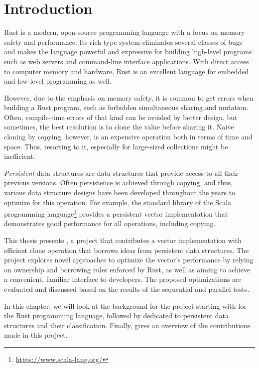 \chapter{Introduction}

Rust is a modern, open-source programming language with a focus on memory safety and performance. Its rich type system eliminates several classes of bugs and makes the language powerful and expressive for building high-level programs such as web servers and command-line interface applications. With direct access to computer memory and hardware, Rust is an excellent language for embedded and low-level programming as well.

However, due to the emphasis on memory safety, it is common to get errors when building a Rust program, such as forbidden simultaneous sharing and mutation. Often, compile-time errors of that kind can be avoided by better design, but sometimes, the best resolution is to clone the value before sharing it. Naive cloning by copying, however, is an expensive operation both in terms of time and space. Thus, resorting to it, especially for large-sized collections might be inefficient.

\emph{Persistent} data structures are data structures that provide access to all their previous versions. Often persistence is achieved through copying, and thus, various data structure designs have been developed throughout the years to optimize for this operation. For example, the standard library of the Scala programming language\footnote{\url{https://www.scala-lang.org/}} provides a persistent vector implementation that demonstrates good performance for all operations, including copying.

This thesis presents \pvecrs{}, a project that contributes a vector implementation with efficient clone operation that borrows ideas from persistent data structures. The project explores novel approaches to optimize the vector's performance by relying on ownership and borrowing rules enforced by Rust, as well as aiming to achieve a convenient, familiar interface to developers. The proposed optimizations are evaluated and discussed based on the results of the sequential and parallel tests.

In this chapter, we will look at the background for the \pvecrs{} project starting with  for the Rust programming language, followed by  dedicated to persistent data structures and their classification. Finally,  gives an overview of the contributions made in this project.

